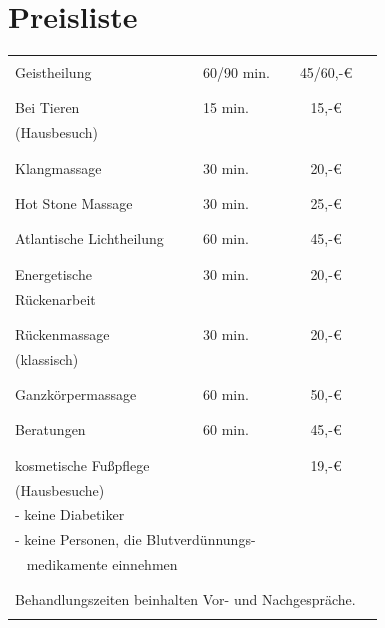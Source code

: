 \documentclass[10pt,foldmark,notumble]{leaflet}
\begin{document}
\section{Preisliste}
\begin{tabular}{p{35mm}lcr}%
\\
\hline
\\
Geistheilung &   60/90 min. & 45/60,-€   \\
\\
\hline
\\
Bei Tieren   & 15 min. &  15,-€ \\
(Hausbesuch) & & \\
\\
\hline
\\
Klangmassage   & 30 min. &  20,-€ \\
\\
\hline
\\
Hot Stone Massage   & 30 min. & 25,-€   \\
\\
\hline 
\\
Atlantische Lichtheilung  & 60 min. &  45,-€ \\
\\
\hline
\\
Energetische  & 30 min. &  20,-€ \\
Rückenarbeit& &\\
\\
\hline
\\
Rückenmassage   & 30 min. & 20,-€ \\
(klassisch)& &\\
\\
\hline
\\
Ganzkörpermassage & 60 min. & 50,-€ \\
\\
\hline
\\
Beratungen & 60 min. & 45,-€ \\
\\
\hline
\\
kosmetische Fußpflege & & 19,-€\\
(Hausbesuche) & & \\
\multicolumn{2}{l}{- keine Diabetiker }\\
\multicolumn{2}{l}{- keine Personen, die Blutverdünnungs-}\\
\multicolumn{2}{l}{~ medikamente einnehmen}\\
\\
\hline
\\
\multicolumn{3}{l}{Behandlungszeiten beinhalten Vor- und Nachgespräche.}\\
\\
\hline
\end{tabular} %
\end{document}
